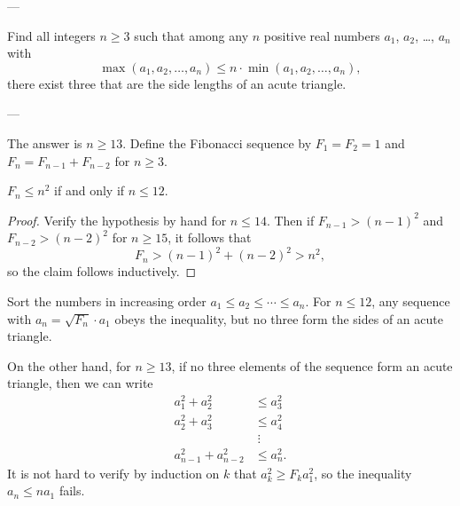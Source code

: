 
---

Find all integers $n\ge3$ such that among any $n$ positive real numbers $a_1$, $a_2$, \ldots, $a_n$ with
\[\max(a_1,a_2,\ldots,a_n)\le n\cdot\min(a_1,a_2,\ldots,a_n),\]
there exist three that are the side lengths of an acute triangle.

---

The answer is $n\ge13$. Define the Fibonacci sequence by $F_1=F_2=1$ and $F_n=F_{n-1}+F_{n-2}$ for $n\ge3$.
\begin{claim*}
    $F_n\le n^2$ if and only if $n\le12$.
\end{claim*}
\begin{proof}
    Verify the hypothesis by hand for $n\le14$. Then if $F_{n-1}>(n-1)^2$ and $F_{n-2}>(n-2)^2$ for $n\ge15$, it follows that \[F_n>(n-1)^2+(n-2)^2>n^2,\]
    so the claim follows inductively.
\end{proof}

Sort the numbers in increasing order $a_1\le a_2\le\cdots\le a_n$. For $n\le12$, any sequence with $a_n=\sqrt{F_n}\cdot a_1$ obeys the inequality, but no three form the sides of an acute triangle.

On the other hand, for $n\ge13$, if no three elements of the sequence form an acute triangle, then we can write
\begin{align*}
    a_1^2+a_2^2&\le a_3^2\\
    a_2^2+a_3^2&\le a_4^2\\
    &\;\vdots\\
    a_{n-1}^2+a_{n-2}^2&\le a_n^2.
\end{align*}
It is not hard to verify by induction on $k$ that $a_k^2\ge F_ka_1^2$, so the inequality $a_n\le na_1$ fails.

